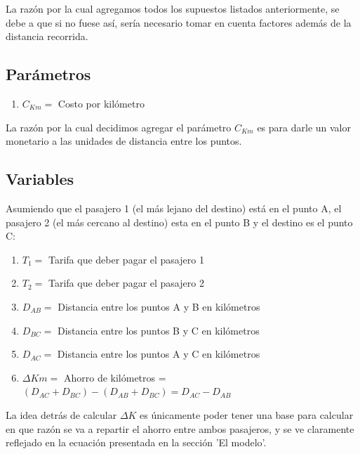 \documentclass[12pt]{report}
\begin{document}
La razón por la cual agregamos todos los supuestos listados anteriormente, se debe a que si no fuese así, sería necesario tomar en cuenta factores además de la distancia recorrida.

\subsection*{Parámetros}
\begin{enumerate}
    \item $C_{Km}=$ Costo por kilómetro
\end{enumerate}
La razón por la cual decidimos agregar el parámetro $C_{Km}$ es para darle un valor monetario a las unidades de distancia entre los puntos.

\subsection*{Variables}
Asumiendo que el pasajero 1 (el más lejano del destino) está en el punto A, el pasajero 2 (el más cercano al destino) esta en el punto B y el destino es el punto C:

\begin{enumerate}
    \item $T_{1}=$ Tarifa que deber pagar el pasajero 1
    \item $T_{2}=$ Tarifa que deber pagar el pasajero 2
    \item $D_{AB}=$ Distancia entre los puntos A y B en kilómetros
    \item $D_{BC}=$ Distancia entre los puntos B y C en kilómetros
    \item $D_{AC}=$ Distancia entre los puntos A y C en kilómetros
    \item $\Delta Km=$ Ahorro de kilómetros = $(D_{AC}+D_{BC})-(D_{AB}+D_{BC})=D_{AC}-D_{AB}$ 
\end{enumerate}

La idea detrás de calcular $\Delta K$ es únicamente poder tener una base para calcular en que razón se va a repartir el ahorro entre ambos pasajeros, y se ve claramente reflejado en la ecuación presentada en la sección 'El modelo'.



\newpage
\end{document}

